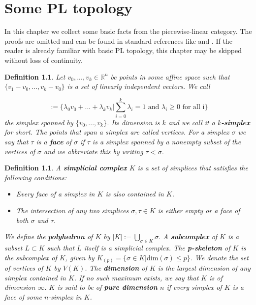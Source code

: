 \documentclass{scrreprt}
\newtheorem{definition}[prop]{Definition}
\begin{document}
\chapter{Some PL topology}
\label{sec:Einleitung}

In this chapter we collect some basic facts from the piecewise-linear category. The proofs are omitted and can be found in standard references like \cite{pltopo} and \cite{hatcher}. If the reader is already familiar with basic PL topology, this chapter may be skipped without loss of continuity.

\begin{definition}
Let $v_0,...,v_k \in \mathbb{R}^n$ be points in some affine space such that \\ $\{ v_1-v_0,...,v_k-v_0 \}$ is a set of linearly independent vectors. We call

\begin{equation*}
[v_0,...,v_k] := \Biggl \{  \lambda_0v_0+...+ \lambda_kv_k \Bigg |  \sum_{i=0}^k \lambda_i =1 \text{ and } \lambda_i \geq 0 \text{ for all i} \Biggr \}
\end{equation*}
the simplex spanned by $\{v_0,...,v_k \}$. Its dimension is $k$ and we call it a \textbf{$k$-simplex} for short. The points that span a simplex are called vertices. For a simplex $\sigma$ we say that $\tau$ is a \textbf{face} of $\sigma$ if $\tau$ is a simplex spanned by a nonempty subset of the vertices of $\sigma$ and we abbreviate this by writing $\tau < \sigma$.
\end{definition}

\begin{definition}
A \textbf{simplicial complex} $K$ is a set of simplices that satisfies the following conditions:

\begin{itemize}
\item Every face of a simplex in $K$ is also contained in $K$.
\item The intersection of any two simplices $\sigma, \tau \in K$ is either empty or a face of both $\sigma$ and $\tau$.
\end{itemize}

We define the \textbf{polyhedron} of $K$ by $|K|:= \bigcup_{\sigma \in K} \sigma  $. A \textbf{subcomplex} of $K$ is a subset $L \subset K$ such that $L$ itself is a simplicial complex. The \textbf{p-skeleton} of $K$ is the subcomplex of $K$, given by $K_{(p)}= \{ \sigma \in  K | \text{dim}(\sigma) \leq p \}$. We denote the set of vertices of $K$ by $V(K)$. The \textbf{dimension} of $K$ is the largest dimension of any simplex contained in $K$. If no such maximum exists, we say that $K$ is of dimension $\infty$. $K$ is said to be of \textbf{pure dimension} $n$ if every simplex of $K$ is a face of some $n$-simplex in $K$.
\end{definition}
\end{document}
